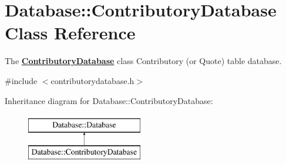 \hypertarget{classDatabase_1_1ContributoryDatabase}{\section{Database\+:\+:Contributory\+Database Class Reference}
\label{classDatabase_1_1ContributoryDatabase}
}


The {\bfseries \hyperlink{classDatabase_1_1ContributoryDatabase}{Contributory\+Database}} class Contributory (or Quote) table database.  




{\ttfamily \#include $<$contributorydatabase.\+h$>$}

Inheritance diagram for Database\+:\+:Contributory\+Database\+:\begin{figure}[H]
\begin{center}
\leavevmode
\includegraphics[height=2.000000cm]{d5/de0/classDatabase_1_1ContributoryDatabase}
\end{center}
\end{figure}

